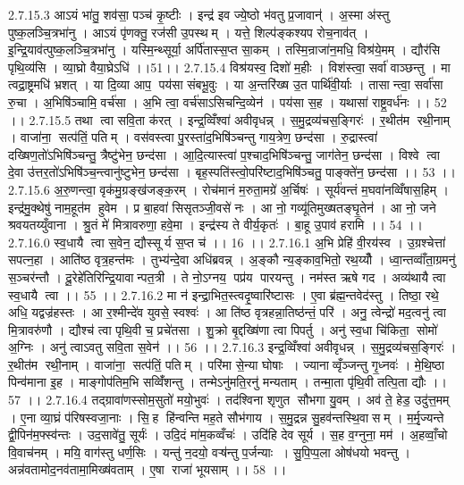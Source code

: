 2.7.15.3
आऽयं भा॑तु॒ शव॑सा॒ पञ्च॑ कृ॒ष्टीः । इन्द्र॑ इव ज्ये॒ष्ठो भ॑वतु प्र॒जावान्॑ । अ॒स्मा अ॑स्तु पुष्क॒लञ्चि॒त्रभा॑नु । आऽयं पृ॑णक्तु॒ रज॑सी उ॒पस्थम् । यत्ते॒ शिल्प॑ङ्कश्यप रोच॒नाव॑त् । इ॒न्द्रि॒याव॑त्पुष्क॒लञ्चि॒त्रभा॑नु । यस्मि॒न्थ्सूर्या॒ अर्पि॑तास्स॒प्त सा॒कम् । तस्मि॒न्राजा॑न॒मधि॒ विश्र॑ये॒मम् । द्यौर॑सि पृथि॒व्य॑सि । व्या॒घ्रो वैया॒घ्रेऽधि॑ ।।51।।
2.7.15.4
विश्र॑यस्व॒ दिशो॑ म॒हीः । विश॑स्त्वा॒ सर्वा॑ वाञ्छन्तु । मा त्वद्रा॒ष्ट्रमधि॑ भ्रशत् । या दि॒व्या आप॒ पय॑सा संबभू॒वुः । या अ॒न्तरि॑ख्ष उ॒त पार्थि॑वी॒र्याः । तासान्त्वा॒ सर्वा॑सा रु॒चा । अ॒भिषि॑ञ्चामि॒ वर्च॑सा । अ॒भि त्वा॒ वर्च॑साऽसिचन्दि॒व्येन॑ । पय॑सा स॒ह । यथासा॑ राष्ट्र॒वर्ध॑नः ।। 52 ।।
2.7.15.5
तथा त्वा सवि॒ता क॑रत् । इन्द्र॒व्विँश्वा॑ अवीवृधन्न् । स॒मु॒द्रव्य॑चस॒ङ्गिरः॑ । र॒थीत॑म रथी॒नाम् । वाजा॑ना॒॒ सत्प॑तिं॒ पतिम् । वस॑वस्त्वा पु॒रस्ता॑द॒भिषि॑ञ्चन्तु गाय॒त्रेण॒ छन्द॑सा । रु॒द्रास्त्वा॑ दख्षिण॒तो॑ऽभिषि॑ञ्चन्तु॒ त्रैष्टु॑भेन॒ छन्द॑सा । आ॒दि॒त्यास्त्वा॑ प॒श्चाद॒भिषि॑ञ्चन्तु॒ जाग॑तेन॒ छन्द॑सा । विश्वे त्वा दे॒वा उ॑त्तर॒तो॑ऽभिषि॑ञ्च॒न्त्वानु॑ष्टुभेन॒ छन्द॑सा । बृह॒स्पति॑स्त्वो॒परि॑ष्टाद॒भिषि॑ञ्चतु॒ पाङ्क्ते॑न॒ छन्द॑सा ।। 53 ।।
2.7.15.6
अ॒रु॒णन्त्वा॒ वृक॑मु॒ग्रङ्ख॑जङ्क॒रम् । रोच॑मानं म॒रुता॒मग्रे॑ अ॒र्चिषः॑ । सूर्य॑वन्तं म॒घवा॑नव्विँषास॒हिम् । इन्द्र॑मु॒क्थेषु॑ नाम॒हूत॑म हुवेम । प्र बा॒हवा॑ सिसृतञ्जी॒वसे॑ नः । आ नो॒ गव्यू॑तिमुख्षतङ्घृ॒तेन॑ । आ नो॒ जने श्रवयतय्युँवाना । श्रु॒तं मे॑ मित्रावरुणा॒ हवे॒मा । इन्द्र॑स्य ते वीर्य॒कृतः॑ । बा॒हू उ॒पाव॑ हरामि ।। 54 ।।
2.7.16.0
स्व॒धायै त्वा स॒वेन॒ द्यौस्सूर्य स॒प्त च॑ ।। 16 ।।
2.7.16.1
अ॒भि प्रेहि॑ वी॒रय॑स्व । उ॒ग्रश्चेत्ता॑ सपत्न॒हा । आति॑ष्ठ वृत्र॒हन्त॑मः । तुभ्य॑न्दे॒वा अधि॑ब्रवन्न् । अ॒ङ्कौ न्य॒ङ्काव॒भितो॒ रथ॒य्यौँ । ध्वा॒न्तव्वाँ॑ता॒ग्रमनु॑ स॒ञ्चर॑न्तौ । दू॒रेहे॑तिरिन्द्रि॒यावान्पत॒त्री । ते नो॒ऽग्नय॒ पप्र॑य पारयन्तु । नम॑स्त ऋषे गद । अव्य॑थायै त्वा स्व॒धायै त्वा ।। 55 ।।
2.7.16.2
मा न॑ इन्द्रा॒भित॒स्त्वदृ॒ष्वारि॑ष्टासः । ए॒वा ब्र॑ह्म॒न्तवेद॑स्तु । तिष्ठा॒ रथे॒ अधि॒ यद्वज्र॑हस्तः । आ र॒श्मीन्दे॑व युवसे॒ स्वश्वः॑ । आ ति॑ष्ठ वृत्रहन्ना॒तिष्ठ॑न्तं॒ परि॑ । अनु॒ त्वेन्द्रो॑ मद॒त्वनु॑ त्वा मि॒त्रावरु॑णौ । द्यौश्च॑ त्वा पृथि॒वी च॒ प्रचे॑तसा । शु॒क्रो बृ॒द्दख्षि॑णा त्वा पिपर्तु । अनु॑ स्व॒धा चि॑किता॒॒ सोमो॑ अ॒ग्निः । अनु॑ त्वाऽवतु सवि॒ता स॒वेन॑ ।। 56 ।।
2.7.16.3
इन्द्र॒व्विँश्वा॑ अवीवृधन्न् । स॒मु॒द्रव्य॑चस॒ङ्गिरः॑ । र॒थीत॑म रथी॒नाम् । वाजा॑ना॒॒ सत्प॑तिं॒ पतिम् । परि॑मा से॒न्या घोषाः । ज्यानाव्वृँञ्जन्तु गृ॒ध्नवः॑ । मे॒थि॒ष्ठा पिन्व॑माना इ॒ह । माङ्गोप॑तिम॒भि सव्विँ॑शन्तु । तन्मेऽनु॑मति॒रनु॑ मन्यताम् । तन्मा॒ता पृ॑थि॒वी तत्पि॒ता द्यौः ।। 57 ।।
2.7.16.4
तद्ग्रावा॑णस्सोम॒सुतो॑ मयो॒भुवः॑ । तद॑श्विना शृणुत सौभगा यु॒वम् । अव॑ ते॒ हेड॒ उदु॑त्त॒मम् । ए॒ना व्या॒घ्रं प॑रिषस्वजा॒नाः । सि॒॒ह हि॑न्वन्ति मह॒ते सौभ॑गाय । स॒मु॒द्रन्न सु॒हव॑न्तस्थि॒वासम् । म॒र्मृ॒ज्यन्ते द्वी॒पिन॑म॒फ्स्व॑न्तः । उद॒सावे॑तु॒ सूर्यः॑ । उदि॒दं मा॑म॒कव्वँचः॑ । उदि॑हि देव सूर्य । स॒ह व॒ग्नुना॒ मम॑ । अ॒हव्वाँ॒चो वि॒वाच॑नम् । मयि॒ वाग॑स्तु धर्ण॒सिः । यन्तु॑ न॒दयो॒ वऱ्ष॑न्तु प॒र्जन्याः । सु॒पि॒प्प॒ला ओष॑धयो भवन्तु । अन्न॑वतामोद॒नव॑तामा॒मिख्ष॑वताम् । ए॒षा राजा॑ भूयसाम् ।। 58 ।।
